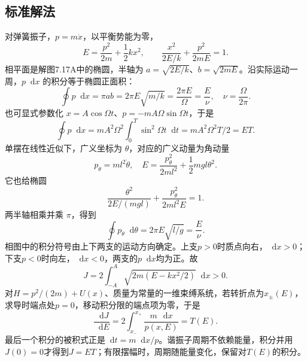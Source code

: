 \documentclass[UTF8,fontset=fandol,a4paper,11pt]{ctexart}
\newcommand{\dd}{\mathop{}\!\mathrm{d}}
\newcommand{\figcaption}[1]{\par\vspace{2pt}{\small\color{muted}#1}\par}
\begin{document}

\subsection*{标准解法}

\begin{center}\begin{minipage}{\linewidth}\centering{}\figcaption{解图 7.17A}\end{minipage}\end{center}
对弹簧振子，$p=m\dot x$，以平衡势能为零，
\[E=\frac{p^2}{2m}+\frac12kx^2,
\qquad\frac{x^2}{2E/k}+\frac{p^2}{2mE}=1.\]
相平面是解图7.17A中的椭圆，半轴为 $a=\sqrt{2E/k}$、$b=\sqrt{2mE}$。沿实际运动一周，$p\dd x$ 的积分等于椭圆正面积：
\[\oint p\dd x=\pi ab=2\pi E\sqrt{m/k}
=\frac{2\pi E}{\Omega}=\frac E\nu,\quad\nu=\frac\Omega{2\pi}.\]
也可显式参数化 $x=A\cos\Omega t$、$p=-mA\Omega\sin\Omega t$，于是
\[\oint p\dd x=mA^2\Omega^2\int_0^T\sin^2\Omega t\dd t
=mA^2\Omega^2T/2=ET.\]
单摆在线性近似下，广义坐标为 $\theta$，对应的广义动量为角动量
\[p_\theta=ml^2\dot\theta,\quad
E=\frac{p_\theta^2}{2ml^2}+\frac12mgl\theta^2.\]
它也给椭圆
\[\frac{\theta^2}{2E/(mgl)}+\frac{p_\theta^2}{2ml^2E}=1.\]
两半轴相乘并乘 $\pi$，得到
\[\boxed{\oint p_\theta\dd\theta=2\pi E\sqrt{l/g}=\frac E\nu.}\]
相图中的积分符号由上下两支的运动方向确定。上支$p>0$时质点向右，$\dd x>0$；下支$p<0$时向左，$\dd x<0$，两支的$p\dd x$均为正。故
\[J=2\int_{-A}^{A}\sqrt{2m(E-kx^2/2)}\dd x>0.\]
对$H=p^2/(2m)+U(x)$、质量为常量的一维束缚系统，若转折点为$x_\pm(E)$，求导时端点处$p=0$，移动积分限的端点项为零，于是
\[\frac{\dd J}{\dd E}=2\int_{x_-}^{x_+}\frac{m\,\dd x}{p(x,E)}=T(E).\]
最后一个积分的被积式正是$\dd t= m\dd x/p$。谐振子周期不依赖能量，积分并用$J(0)=0$才得到$J=ET$；有限摆幅时，周期随能量变化，保留对$T(E)$的积分。
\end{document}

